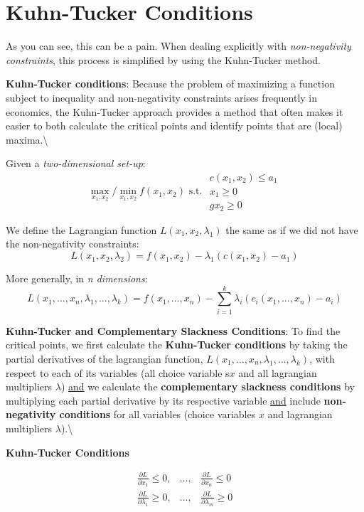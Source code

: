 \documentclass[]{book}
\theoremstyle{definition}
\theoremstyle{definition}
\theoremstyle{definition}
\theoremstyle{remark}
\begin{document}
\section{Kuhn-Tucker Conditions}\label{kuhn-tucker-conditions}

As you can see, this can be a pain. When dealing explicitly with
\textit{non-negativity constraints}, this process is simplified by using
the Kuhn-Tucker method.

\textbf{\bf Kuhn-Tucker conditions}: Because the problem of maximizing a
function subject to inequality and non-negativity constraints arises
frequently in economics, the Kuhn-Tucker approach provides a method that
often makes it easier to both calculate the critical points and identify
points that are (local) maxima.\textbackslash{}

Given a \textit{two-dimensional set-up}:
\[\max_{x_1,x_2}/\min_{x_1,x_2} f(x_1,x_2) \text{ s.t. }
\begin{array}{l}
c(x_1,x_2) \le a_1\\
x_1 \ge 0 \\
gx_2 \ge 0
\end{array}\]

We define the Lagrangian function \(L(x_1,x_2,\lambda_1)\) the same as
if we did not have the non-negativity constraints:
\[L(x_1,x_2,\lambda_2) = f(x_1,x_2) - \lambda_1(c(x_1,x_2) - a_1)\]

More generally, in \textit{n dimensions}:
\[ L(x_1, \dots, x_n, \lambda_1, \dots, \lambda_k) = f(x_1, \dots, x_n) - \sum_{i=1}^k\lambda_i(c_i(x_1,\dots, x_n) - a_i)\]

\textbf{Kuhn-Tucker and Complementary Slackness Conditions}: To find the
critical points, we first calculate the \textbf{Kuhn-Tucker conditions}
by taking the partial derivatives of the lagrangian function,
\(L(x_1,\dots,x_n,\lambda_1,\dots,\lambda_k)\), with respect to each of
its variables (all choice variable s\(x\) and all lagrangian multipliers
\(\lambda\)) \underline{and} we calculate the
\textbf{complementary slackness conditions} by multiplying each partial
derivative by its respective variable \underline{and} include
\textbf{non-negativity conditions} for all variables (choice variables
\(x\) and lagrangian multipliers \(\lambda\)).\textbackslash{}

\textbf{Kuhn-Tucker Conditions}

\begin{eqnarray*}
\frac{\partial L}{\partial x_1} \leq 0, & \dots, & \frac{\partial L}{\partial x_n} \leq 0\\
\frac{\partial L}{\partial \lambda_1} \geq 0, & \dots, & \frac{\partial L}{\partial \lambda_m} \geq 0
\end{eqnarray*}
\end{document}
